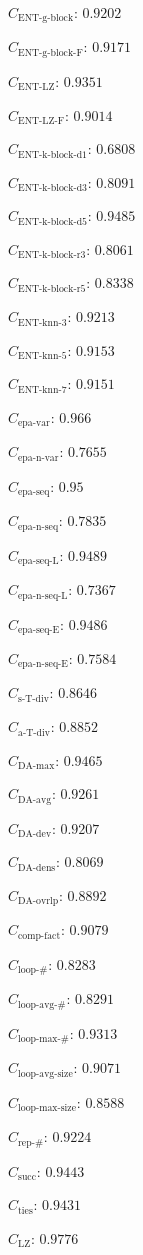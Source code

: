\documentclass[a4paper]{article}
\newcommand{\daavgname}{\text{DA-avg}}
\newcommand{\daavg}{C_{\daavgname}}
\newcommand{\damaxname}{\text{DA-max}}
\newcommand{\damax}{C_{\damaxname}}
\newcommand{\dadevname}{\text{DA-dev}}
\newcommand{\dadev}{C_{\dadevname}}
\newcommand{\dadensname}{\text{DA-dens}}
\newcommand{\dadens}{C_{\dadensname}}
\newcommand{\daoverlapname}{\text{DA-ovrlp}}
\newcommand{\daoverlap}{C_{\daoverlapname}}
\newcommand{\complexityfactorname}{\text{comp-fact}}
\newcommand{\complexityfactor}{C_{\complexityfactorname}}
\newcommand{\simpletracedivname}{\text{s-T-div}}
\newcommand{\simpletracediv}{C_{\simpletracedivname}}
\newcommand{\advtracedivname}{\text{a-T-div}}
\newcommand{\advtracediv}{C_{\advtracedivname}}
\newcommand{\loopnumname}{\text{loop-\#}}
\newcommand{\loopnum}{C_{\loopnumname}}
\newcommand{\loopavgname}{\text{loop-avg-\#}}
\newcommand{\loopavg}{C_{\loopavgname}}
\newcommand{\loopmaxname}{\text{loop-max-\#}}
\newcommand{\loopmax}{C_{\loopmaxname}}
\newcommand{\loopavgsizename}{\text{loop-avg-size}}
\newcommand{\loopavgsize}{C_{\loopavgsizename}}
\newcommand{\loopmaxsizename}{\text{loop-max-size}}
\newcommand{\loopmaxsize}{C_{\loopmaxsizename}}
\newcommand{\repnumname}{\text{rep-\#}}
\newcommand{\repnum}{C_{\repnumname}}
\newcommand{\numberofneighborhoodsname}{\text{succ}}
\newcommand{\numberofneighborhoods}{C_{\numberofneighborhoodsname}}
\newcommand{\numberoftiesname}{\text{ties}}
\newcommand{\numberofties}{C_{\numberoftiesname}}
\newcommand{\lempelzivname}{\text{LZ}}
\newcommand{\lempelziv}{C_{\lempelzivname}}
\newcommand{\entgblockname}{\text{ENT-g-block}}
\newcommand{\entgblock}{C_{\entgblockname}}
\newcommand{\entgblockflatname}{\text{ENT-g-block-F}}
\newcommand{\entgblockflat}{C_{\entgblockflatname}}
\newcommand{\entlempelzivname}{\text{ENT-LZ}}
\newcommand{\entlempelziv}{C_{\entlempelzivname}}
\newcommand{\entlempelzivflatname}{\text{ENT-LZ-F}}
\newcommand{\entlempelzivflat}{C_{\entlempelzivflatname}}
\newcommand{\entkblockdonename}{\text{ENT-k-block-d1}}
\newcommand{\entkblockdone}{C_{\entkblockdonename}}
\newcommand{\entkblockdthreename}{\text{ENT-k-block-d3}}
\newcommand{\entkblockdthree}{C_{\entkblockdthreename}}
\newcommand{\entkblockdfivename}{\text{ENT-k-block-d5}}
\newcommand{\entkblockdfive}{C_{\entkblockdfivename}}
\newcommand{\entkblockrthreename}{\text{ENT-k-block-r3}}
\newcommand{\entkblockrthree}{C_{\entkblockrthreename}}
\newcommand{\entkblockrfivename}{\text{ENT-k-block-r5}}
\newcommand{\entkblockrfive}{C_{\entkblockrfivename}}
\newcommand{\entknnthreename}{\text{ENT-knn-3}}
\newcommand{\entknnthree}{C_{\entknnthreename}}
\newcommand{\entknnfivename}{\text{ENT-knn-5}}
\newcommand{\entknnfive}{C_{\entknnfivename}}
\newcommand{\entknnsevenname}{\text{ENT-knn-7}}
\newcommand{\entknnseven}{C_{\entknnsevenname}}
\newcommand{\epavariantname}{\text{epa-var}}
\newcommand{\epavariant}{C_{\epavariantname}}
\newcommand{\epanormvariantname}{\text{epa-n-var}}
\newcommand{\epanormvariant}{C_{\epanormvariantname}}
\newcommand{\epasequencename}{\text{epa-seq}}
\newcommand{\epasequence}{C_{\epasequencename}}
\newcommand{\epanormsequencename}{\text{epa-n-seq}}
\newcommand{\epanormsequence}{C_{\epanormsequencename}}
\newcommand{\epasequencelname}{\text{epa-seq-L}}
\newcommand{\epasequencel}{C_{\epasequencelname}}
\newcommand{\epanormsequencelname}{\text{epa-n-seq-L}}
\newcommand{\epanormsequencel}{C_{\epanormsequencelname}}
\newcommand{\epasequenceename}{\text{epa-seq-E}}
\newcommand{\epasequencee}{C_{\epasequenceename}}
\newcommand{\epanormsequenceename}{\text{epa-n-seq-E}}
\newcommand{\epanormsequencee}{C_{\epanormsequenceename}}
\begin{document}
\begin{compactitem}
\item $\entgblock$: $0.9202$
\item $\entgblockflat$: $0.9171$
\item $\entlempelziv$: $0.9351$
\item $\entlempelzivflat$: $0.9014$
\item $\entkblockdone$: $0.6808$
\item $\entkblockdthree$: $0.8091$
\item $\entkblockdfive$: $0.9485$
\item $\entkblockrthree$: $0.8061$
\item $\entkblockrfive$: $0.8338$
\item $\entknnthree$: $0.9213$
\item $\entknnfive$: $0.9153$
\item $\entknnseven$: $0.9151$
\item $\epavariant$: $0.966$
\item $\epanormvariant$: $0.7655$
\item $\epasequence$: $0.95$
\item $\epanormsequence$: $0.7835$
\item $\epasequencel$: $0.9489$
\item $\epanormsequencel$: $0.7367$
\item $\epasequencee$: $0.9486$
\item $\epanormsequencee$: $0.7584$
\item $\simpletracediv$: $0.8646$
\item $\advtracediv$: $0.8852$
\item $\damax$: $0.9465$
\item $\daavg$: $0.9261$
\item $\dadev$: $0.9207$
\item $\dadens$: $0.8069$
\item $\daoverlap$: $0.8892$
\item $\complexityfactor$: $0.9079$
\item $\loopnum$: $0.8283$
\item $\loopavg$: $0.8291$
\item $\loopmax$: $0.9313$
\item $\loopavgsize$: $0.9071$
\item $\loopmaxsize$: $0.8588$
\item $\repnum$: $0.9224$
\item $\numberofneighborhoods$: $0.9443$
\item $\numberofties$: $0.9431$
\item $\lempelziv$: $0.9776$

\end{compactitem}
\end{document}
